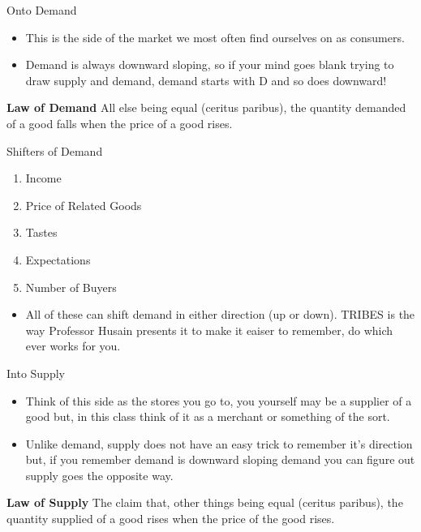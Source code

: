 \documentclass{beamer}
\begin{document}
\begin{frame}{Onto Demand}
    \begin{itemize}
        \item This is the side of the market we most often find ourselves on as consumers.
        \vspace{5mm}
        \item Demand is always downward sloping, so if your mind goes blank trying to draw supply and demand, demand starts with D and so does downward!
    \end{itemize}
    \vspace{5mm}
    \begin{block}{\textbf{Law of Demand}}
        All else being equal (ceritus paribus), the quantity demanded of a good falls when the price of a good rises.
    \end{block}
\end{frame}

\begin{frame}{Shifters of Demand}
    \begin{enumerate}
        \item<1-> Income
        \item<2-> Price of Related Goods
        \item<3-> Tastes
        \item<4-> Expectations
        \item<5-> Number of Buyers
    \end{enumerate}
    \vspace{5mm}
    \begin{itemize}
        \item<6-> All of these can shift demand in either direction (up or down). TRIBES is the way Professor Husain presents it to make it eaiser to remember, do which ever works for you.
    \end{itemize}
\end{frame}

\begin{frame}{Into Supply}
    \begin{itemize}
        \item Think of this side as the stores you go to, you yourself may be a supplier of a good but, in this class think of it as a merchant or something of the sort.
        \vspace{5mm}
        \item Unlike demand, supply does not have an easy trick to remember it's direction but, if you remember demand is downward sloping demand you can figure out supply goes the opposite way.
    \end{itemize}
    \vspace{5mm}
    \begin{block}{\textbf{Law of Supply}}
        The claim that, other things being equal (ceritus paribus), the quantity supplied of a good rises when the price of the good rises.
    \end{block}
\end{frame}
\end{document}
